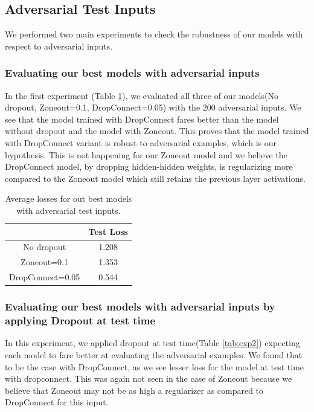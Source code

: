 \documentclass{article}
\begin{document}
\subsection{Adversarial Test Inputs}
We performed two main experiments to check the robustness of our models with respect to adversarial inputs. 
\subsubsection{Evaluating our best models with adversarial inputs}
In the first experiment (Table \ref{tab:exp1}), we evaluated all three of our models(No dropout, Zoneout=0.1, DropConnect=0.05) with the 200 adversarial inputs. We see that the model trained with DropConnect fares better than the model without dropout and the model with Zoneout. This proves that the model trained with DropConnect variant is robust to adversarial examples, which is our hypothesis. This is not happening for our Zoneout model and we believe the DropConnect model, by dropping hidden-hidden weights, is regularizing more compared to the Zoneout model which still retains the previous layer activations.
\begin{table}[h]
	\begin{center}
		\begin{tabular}{c|c} %
			\textbf{} & \textbf{Test Loss} \\
			\hline
			No dropout & 1.208\\
			Zoneout=0.1 & 1.353\\
			DropConnect=0.05 & 0.544\\
		\end{tabular}
		\medskip
		\caption{Average losses for out best models with adversarial test inputs.}
		\label{tab:exp1}
	\end{center}
\end{table}

\subsubsection{Evaluating our best models with adversarial inputs by applying Dropout at test time}

In this experiment, we applied dropout at test time(Table \ref{tab:exp2}) expecting each model to fare better at evaluating the adversarial examples. We found that to be the case with DropConnect, as we see lesser loss for the model at test time with dropconnect. This was again not seen in the case of Zoneout because we believe that Zoneout may not be as high a regularizer as compared to DropConnect for this input.
\end{document}
